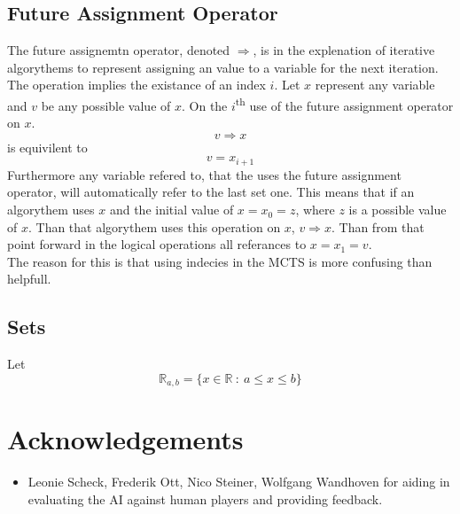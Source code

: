 \documentclass[12pt]{article}
\begin{document}
\subsection{Future Assignment Operator}
\label{sec:assignmentOperator}
The future assignemtn operator, denoted \(\Rightarrow\), is in the explenation of iterative algorythems to represent assigning an value to a variable for the next iteration. The operation implies the existance of an index \(i\). Let \(x\) represent any variable and \(v\) be any possible value of \(x\). On the \(i\)\textsuperscript{th} use of the future assignment operator on \(x\). 
\begin{equation}
v \Rightarrow x
\end{equation}
is equivilent to
\begin{equation}
v = x_{i+1}
\end{equation}
Furthermore any variable refered to, that the uses the future assignment operator, will automatically refer to the last set one. This means that if an algorythem uses \(x\) and the initial value of \(x = x_0 = z\), where \(z\) is a possible value of  \(x\). Than that algorythem uses this operation on \(x\), \(v \Rightarrow x\). Than from that  point forward in the logical operations all referances to \(x = x_1 = v\).\\
The reason for this is that using indecies in the MCTS is more confusing than helpfull.
\subsection{Sets}
Let
\begin{equation}\label{set:Rab}
\mathbb R_{a, b} = \{x \in \mathbb R~:~ a\leq x \leq b\}
\end{equation}




\section*{Acknowledgements}
\begin{itemize}
\item Leonie Scheck, Frederik Ott, Nico Steiner, Wolfgang Wandhoven for aiding in evaluating the AI against human players and providing feedback.
\end{itemize}
\end{document}
